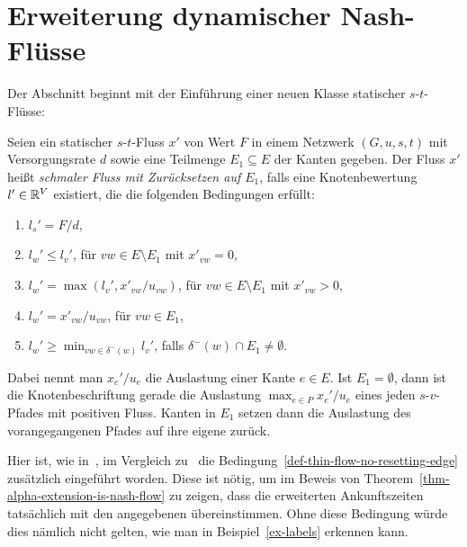 \section{Erweiterung dynamischer Nash-Flüsse}\label{sec-thin-flows}

Der Abschnitt beginnt mit der Einführung einer neuen Klasse statischer $s$-$t$-Flüsse:

\begin{definition}\label{def-thin-flow}
	Seien ein statischer $s$-$t$-Fluss $x'$ von Wert $F$ in einem Netzwerk $(G, u, s, t)$ mit Versorgungsrate $d$ sowie eine Teilmenge $E_1\subseteq E$ der Kanten gegeben.
	Der Fluss $x'$ heißt \emph{schmaler Fluss mit Zurücksetzen auf $E_1$}, falls eine Knotenbewertung $l'\in\mathbb{R}^V$ existiert, die die folgenden Bedingungen erfüllt:
	\begin{enumerate}[label=(T\arabic*)]
	\item\label{def-thin-flow-source} $l_s' = F/d$,
	\item\label{def-thin-flow-x-zero} $l_w' \leq l_v'$, \tabto{4cm} für $vw\in E \setminus E_1$ mit $x'_{vw}=0$,
	\item\label{def-thin-flow-x-positive} $l_w' = \max(l_v', x'_{vw} / u_{vw} )$,  \tabto{4cm} für $vw\in E\setminus E_1$ mit $x'_{vw} > 0$,
	\item\label{def-thin-flow-resetting-edge} $l_w' = x'_{vw} / u_{vw}$,  \tabto{4cm} für $vw\in E_1$,
	\item\label{def-thin-flow-no-resetting-edge} $l_w' \geq \min_{vw\in \delta^-(w)} l_v'$, \tabto{4cm} falls $\delta^-(w)\cap E_1 \neq \emptyset$.
	\end{enumerate}
\end{definition}

Dabei nennt man $x_e'/u_e$ die Auslastung einer Kante $e\in E$.
Ist $E_1 = \emptyset$, dann ist die Knotenbeschriftung gerade die Auslastung $\max_{e\in P} x_e'/u_e$ eines jeden $s$-$v$-Pfades mit positiven Fluss.
Kanten in $E_1$ setzen dann die Auslastung des vorangegangenen Pfades auf ihre eigene zurück.

\begin{remark}
	Hier ist, wie in~\cite[Definition~4]{Cominetti2011}, im Vergleich zu~\cite[Definition~6]{Koch2011} die Bedingung~\ref{def-thin-flow-no-resetting-edge} zusätzlich eingeführt worden.
	Diese ist nötig, um im Beweis von Theorem~\ref{thm-alpha-extension-is-nash-flow} zu zeigen, dass die erweiterten Ankunftszeiten tatsächlich mit den angegebenen übereinstimmen.
	Ohne diese Bedingung würde dies nämlich nicht gelten, wie man in Beispiel~\ref{ex-labels} erkennen kann.
\end{remark}

